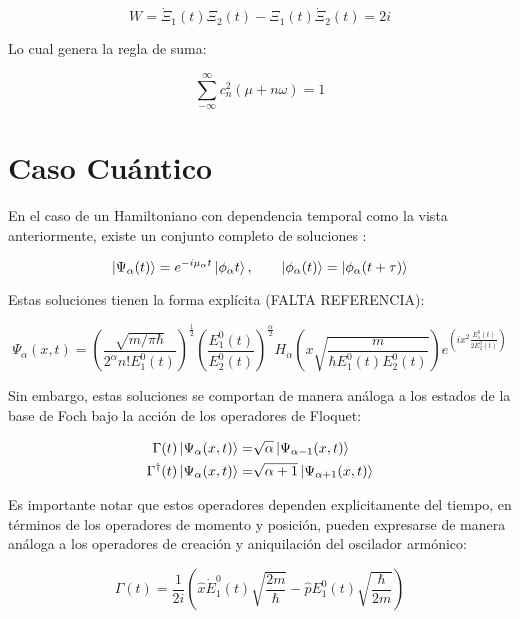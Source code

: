 \documentclass[a4paper,10pt]{report}
\begin{document}
\begin{equation}
W = \dot{\Xi}_1(t)\Xi_2(t)-\Xi_1(t)\dot{\Xi}_2(t) = 2i
\end{equation}

Lo cual genera la regla de suma:

\begin{equation}
\sum_{-\infty}^\infty c_n^2(\mu + n\omega) = 1
\end{equation}

\section{Caso Cuántico}

En el caso de un Hamiltoniano con dependencia temporal como la vista anteriormente, existe un conjunto completo de soluciones \cite{BarnettSD}:

\begin{equation}
\Ket{\Psi_\alpha (t)} = e^{-i\mu_\alpha t}\Ket{\phi_\alpha t}, \qquad \Ket{\phi_\alpha (t)}=\Ket{\phi_\alpha (t+\tau)}
\end{equation}

Estas soluciones tienen la forma explícita (FALTA REFERENCIA):

\begin{equation}
\Psi_\alpha (x,t) = (\frac{\sqrt{m/\pi\hbar}}{2^\alpha n!E_1^0(t)})^{\frac{1}{2}}(\frac{E_1^0(t)}{E_2^0(t)})^\frac{\alpha}{2}H_\alpha(x\sqrt{\frac{m}{\hbar E_1^0(t) E_2^0(t)}})e^{(ix^2\frac{E_1^0(t)}{2E_2^0(t)})}
\end{equation}

Sin embargo, estas soluciones se comportan de manera análoga a los estados de la base de Foch bajo la acción de los operadores de Floquet:

\begin{align*}\label{FloquetOperators}
\Gamma(t) \Ket{\Psi_\alpha (x,t)} =& \sqrt{\alpha}\Ket{\Psi_{\alpha-1} (x,t)} \\
\Gamma^\dagger(t) \Ket{\Psi_\alpha (x,t)} =& \sqrt{\alpha+1}\Ket{\Psi_{\alpha+1} (x,t)}
\end{align*}

Es importante notar que estos operadores dependen explicitamente del tiempo, en términos de los operadores de momento y posición, pueden expresarse de manera análoga a los operadores de creación y aniquilación del oscilador armónico:

\begin{equation}
\Gamma(t) = \frac{1}{2i}(\hat{x}\dot{E}_1^0(t)\sqrt{\frac{2m}{\hbar}}-\hat{p}E_1^0(t)\sqrt{\frac{\hbar}{2m}})
\end{equation}
\end{document}
